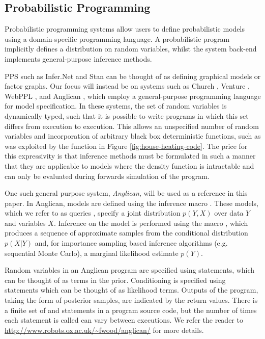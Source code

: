 
\subsection{Probabilistic Programming}
\label{sec:prob-prog}

Probabilistic programming systems allow users to define probabilistic models using a domain-specific programming language. A probabilistic program implicitly defines a distribution on random variables, whilst the system back-end implements general-purpose inference methods.  

PPS such as Infer.Net \citep{minka_software_2010} and Stan \citep{carpenter2015stan} can be thought of as defining graphical models or factor graphs.  Our focus will instead be on systems such as Church \citep{goodman_uai_2008}, Venture \citep{mansinghka2014venture}, WebPPL \citep{goodman_book_2014}, and Anglican \citep{wood2014new}, which employ a general-purpose programming language for model specification. In these systems, the set of random variables is dynamically typed, such that it is possible to write programs in which this set differs from execution to execution.  This allows an unspecified number of random variables and incorporation of arbitrary black box deterministic functions, such as was exploited by the \simulatec function in Figure \ref{fig:house-heating-code}. The price for this expressivity is that inference methods must be formulated in such a manner that they are applicable to models where the density function is intractable and can only be evaluated during forwards simulation of the program. 

One such general purpose system, \emph{Anglican}, will be used as a reference in this paper.  In Anglican, models are defined using the inference macro . These models, which we refer to as queries \citep{goodman_uai_2008}, specify a joint distribution $p(Y,X)$ over data $Y$ and variables $X$. Inference on the model is performed using the macro \doquery, which produces a sequence of approximate samples from the conditional distribution $p(X|Y)$ and, for importance sampling based inference algorithms (e.g. sequential Monte Carlo), a marginal likelihood estimate $p(Y)$.  

Random variables in an Anglican program are specified using \sample statements, which can be thought of as terms in the prior. Conditioning is specified using \observe statements which can be thought of as likelihood terms.  Outputs of the program, taking the form of posterior samples, are indicated by the return values.  There is a finite set of \sample and \observe statements in a program source code, but the number of times each statement is called can vary between executions.  We refer the reader to  \href{http://www.robots.ox.ac.uk/~fwood/anglican/}{\small\url{http://www.robots.ox.ac.uk/~fwood/anglican/}} for more details.